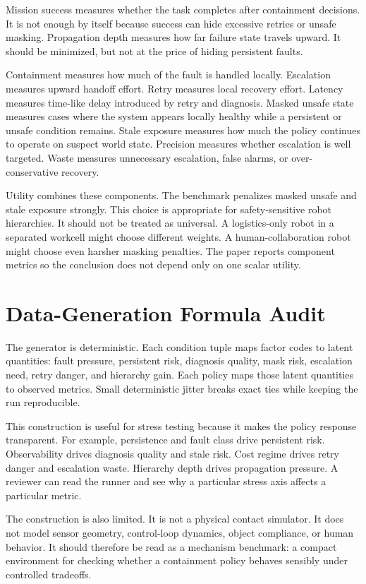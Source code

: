 Mission success measures whether the task completes after containment decisions. It is not enough by itself because success can hide excessive retries or unsafe masking. Propagation depth measures how far failure state travels upward. It should be minimized, but not at the price of hiding persistent faults.

Containment measures how much of the fault is handled locally. Escalation measures upward handoff effort. Retry measures local recovery effort. Latency measures time-like delay introduced by retry and diagnosis. Masked unsafe state measures cases where the system appears locally healthy while a persistent or unsafe condition remains. Stale exposure measures how much the policy continues to operate on suspect world state. Precision measures whether escalation is well targeted. Waste measures unnecessary escalation, false alarms, or over-conservative recovery.

Utility combines these components. The benchmark penalizes masked unsafe and stale exposure strongly. This choice is appropriate for safety-sensitive robot hierarchies. It should not be treated as universal. A logistics-only robot in a separated workcell might choose different weights. A human-collaboration robot might choose even harsher masking penalties. The paper reports component metrics so the conclusion does not depend only on one scalar utility.

\section{Data-Generation Formula Audit}

The generator is deterministic. Each condition tuple maps factor codes to latent quantities: fault pressure, persistent risk, diagnosis quality, mask risk, escalation need, retry danger, and hierarchy gain. Each policy maps those latent quantities to observed metrics. Small deterministic jitter breaks exact ties while keeping the run reproducible.

This construction is useful for stress testing because it makes the policy response transparent. For example, persistence and fault class drive persistent risk. Observability drives diagnosis quality and stale risk. Cost regime drives retry danger and escalation waste. Hierarchy depth drives propagation pressure. A reviewer can read the runner and see why a particular stress axis affects a particular metric.

The construction is also limited. It is not a physical contact simulator. It does not model sensor geometry, control-loop dynamics, object compliance, or human behavior. It should therefore be read as a mechanism benchmark: a compact environment for checking whether a containment policy behaves sensibly under controlled tradeoffs.

